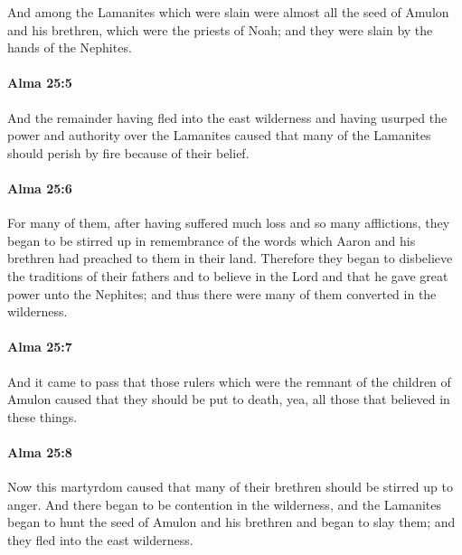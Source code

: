 			And among the Lamanites which were slain
			were almost all the seed of Amulon and his brethren,
			which were the priests of Noah;
			and they were slain by the hands of the Nephites.

		\paragraph{Alma 25:5} %
			\label{ALMA-25-5}

			And the remainder having fled into the east wilderness
			and having usurped the power and authority over the Lamanites
			caused that many of the Lamanites should perish by fire because of their belief.

		\paragraph{Alma 25:6} %
			\label{ALMA-25-6}

			For many of them, after having suffered much loss and so many afflictions,
			they began to be stirred up in remembrance of the words
			which Aaron and his brethren had preached to them in their land.
			Therefore they began to disbelieve the traditions of their fathers
			and to believe in the Lord
			and that he gave great power unto the Nephites;
			and thus there were many of them converted in the wilderness.

		\paragraph{Alma 25:7} %
			\label{ALMA-25-7}

			And it came to pass that those rulers
			which were the remnant of the children of Amulon
			caused that they should be put to death,
			yea, all those that believed in these things.

		\paragraph{Alma 25:8} %
			\label{ALMA-25-8}

			Now this martyrdom caused
			that many of their brethren should be stirred up to anger.
			And there began to be contention in the wilderness,
			and the Lamanites began to hunt the seed of Amulon and his brethren
			and began to slay them;
			and they fled into the east wilderness.

